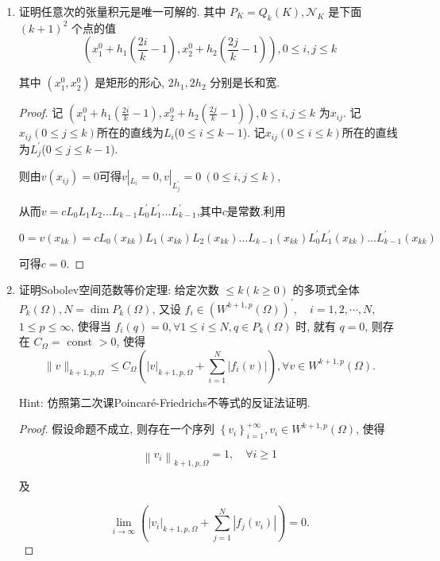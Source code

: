 \documentclass[12pt,a4paper]{article}
\begin{document}
	\begin{enumerate}
		\item 证明任意次的张量积元是唯一可解的. 其中 $P_K=Q_k(K), \mathcal{N}_K$ 是下面 $(k+1)^2$ 个点的值
		$$
		\left(x_1^0+h_1\left(\frac{2 i}{k}-1\right), x_2^0+h_2\left(\frac{2 j}{k}-1\right)\right), 0 \leq i, j \leq k
		$$
		
		其中 $\left(x_1^0, x_2^0\right)$ 是矩形的形心, $2 h_1, 2 h_2$ 分别是长和宽.
		
		\begin{proof}
			记 $	\left(x_1^0+h_1\left(\frac{2 i}{k}-1\right), x_2^0+h_2\left(\frac{2 j}{k}-1\right)\right),0 \leq i, j \leq k$
			为$x_{ij}$. 记$x_{ij}(0 \leq j \leq k)$所在的直线为$L_i$($0 \leq i \leq k-1$). 记$x_{ij}(0 \leq i \leq k)$所在的直线为$L^\prime_j$($0 \leq j \leq k-1$). 
			
			则由$v(x_{ij})=0$可得$v|_{L_i}=0,v|_{L^\prime_j}=0 \ (0 \leq i, j \leq k)$,
			
			从而$v=cL_0L_1 L_2...L_{k-1} L^\prime_0 L^\prime_1...L^\prime_{k-1}$,其中$c$是常数.利用
			
			$$
			0 = v(x_{kk})=cL_0(x_{kk})L_1(x_{kk}) L_2(x_{kk})...L_{k-1}(x_{kk}) L^\prime_0 L^\prime_1(x_{kk})...L^\prime_{k-1}(x_{kk})
			$$
			
			可得$c = 0$.
		\end{proof}
		
		\item 证明Sobolev空间范数等价定理: 给定次数 $\leq k(k \geq 0)$ 的多项式全体 $P_k(\Omega), N=\operatorname{dim} P_k(\Omega)$, 又设 $f_i \in\left(W^{k+1, p}(\Omega)\right)^{\prime}, \quad i=1,2, \cdots, N$, $1 \leq p \leq \infty$, 使得当 $f_i(q)=0, \forall 1 \leq i \leq N, q \in P_k(\Omega)$ 时, 就有 $q=0$, 则存在 $C_{\Omega}=$ const $>0$, 使得
		$$
		\|v\|_{k+1, p, \Omega} \leq C_{\Omega}\left(|v|_{k+1, p, \Omega}+\sum_{i=1}^N\left|f_i(v)\right|\right), \forall v \in W^{k+1, p}(\Omega) .
		$$
		
		Hint: 仿照第二次课Poincaré-Friedrichs不等式的反证法证明.
		
		\begin{proof}
			假设命题不成立, 则存在一个序列 $\left\{v_i\right\}_{i=1}^{+\infty}, v_i \in W^{k+1, p}(\Omega)$, 使得
			
			\begin{equation}
				\left\|v_i\right\|_{k+1, p, \Omega}=1, \quad \forall i \geqslant 1 \label{norm}
			\end{equation}
			
			及
			
			\begin{equation}
				\lim _{i \rightarrow \infty}\left(\left|v_i\right|_{k+1, p, \Omega}+\sum_{j=1}^N\left|f_j\left(v_i\right)\right|\right)=0. \label{eqnorm}
			\end{equation}
			

\end{proof}
\end{enumerate}
\end{document}
